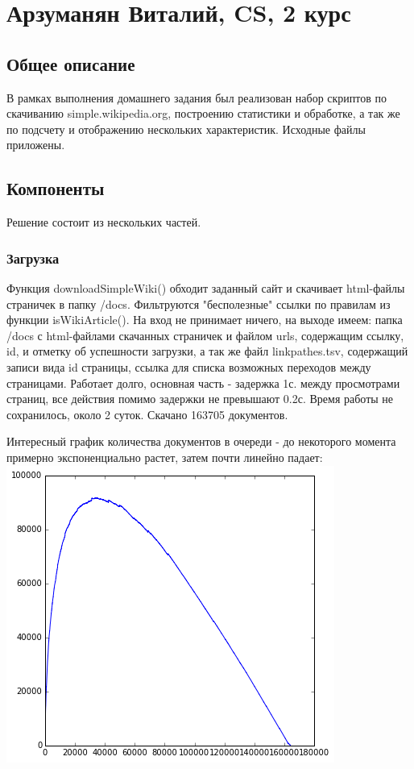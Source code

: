 \documentclass[12pt]{article}
\begin{document}
\section*{Арзуманян Виталий, CS, 2 курс}

\subsection*{Общее описание}
В рамках выполнения домашнего задания был реализован набор скриптов по скачиванию simple.wikipedia.org, построению статистики и обработке, а так же по подсчету и отображению нескольких характеристик. Исходные файлы приложены. 

\subsection*{Компоненты}
Решение состоит из нескольких частей. 

\subsubsection*{Загрузка}
Функция downloadSimpleWiki() обходит заданный сайт и скачивает html-файлы страничек в папку /docs. Фильтруются "бесполезные" ссылки по правилам из функции isWikiArticle(). На вход не принимает ничего, на выходе имеем: папка /docs с html-файлами скачанных страничек и файлом urls, содержащим ссылку, id, и отметку об успешности загрузки, а так же файл linkpathes.tsv, содержащий записи вида id страницы, ссылка для списка возможных переходов между страницами. Работает долго, основная часть - задержка 1с. между просмотрами страниц, все действия помимо задержки не превышают 0.2с. Время работы не сохранилось, около 2 суток. Скачано 163705 документов.

Интересный график количества документов в очереди - до некоторого момента примерно экспоненциально растет, затем почти линейно падает:
\includegraphics[scale=0.7]{downloadingspeed.png}
\end{document}
